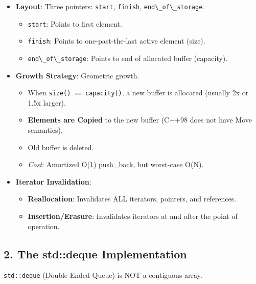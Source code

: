 \begin{itemize}
\tightlist
\item
  \textbf{Layout}: Three pointers: \passthrough{\lstinline!start!},
  \passthrough{\lstinline!finish!},
  \passthrough{\lstinline!end\_of\_storage!}.

  \begin{itemize}
  \tightlist
  \item
    \passthrough{\lstinline!start!}: Points to first element.
  \item
    \passthrough{\lstinline!finish!}: Points to one-past-the-last active
    element (size).
  \item
    \passthrough{\lstinline!end\_of\_storage!}: Points to end of
    allocated buffer (capacity).
  \end{itemize}
\item
  \textbf{Growth Strategy}: Geometric growth.

  \begin{itemize}
  \tightlist
  \item
    When \passthrough{\lstinline!size() == capacity()!}, a new buffer is
    allocated (usually 2x or 1.5x larger).
  \item
    \textbf{Elements are Copied} to the new buffer (C++98 does not have
    Move semantics).
  \item
    Old buffer is deleted.
  \item
    \emph{Cost}: Amortized O(1) push\_back, but worst-case O(N).
  \end{itemize}
\item
  \textbf{Iterator Invalidation}:

  \begin{itemize}
  \tightlist
  \item
    \textbf{Reallocation}: Invalidates ALL iterators, pointers, and
    references.
  \item
    \textbf{Insertion/Erasure}: Invalidates iterators at and after the
    point of operation.
  \end{itemize}
\end{itemize}

\hypertarget{the-stddeque-implementation}{%
\subsection{2. The std::deque
Implementation}\label{the-stddeque-implementation}}

\passthrough{\lstinline!std::deque!} (Double-Ended Queue) is NOT a
contiguous array.

